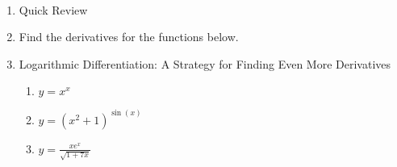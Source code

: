 \documentclass[11pt,fleqn]{article}
\begin{document}
\renewcommand{\headrulewidth}{0pt}
\newcommand{\blank}[1]{\rule{#1}{0.75pt}}
\newcommand{\bc}{\begin{center}}
\newcommand{\ec}{\end{center}}
\renewcommand{\d}{\displaystyle}

\vspace*{-0.7in}

\begin{center}
  \large
  \\
\end{center}
\begin{enumerate}
\item Quick Review 
\vspace{2in}

\item Find the derivatives for the functions below.
\begin{enumerate}
\vfill
{}
\vfill
\end{enumerate}
\newpage
\item Logarithmic Differentiation: A Strategy for Finding Even More Derivatives
	\begin{enumerate}
	\item $y=x^x$
	\vfill
	\item $y=(x^2+1)^{\sin(x)}$
	\vfill
	\item $y=\frac{xe^x}{\sqrt{1+7x}}$
	\vfill
	\end{enumerate}
		
\end{enumerate}
\end{document}
